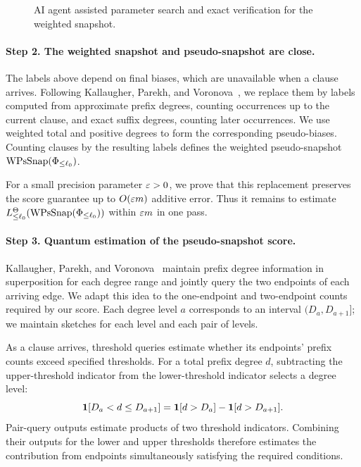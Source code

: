 \begin{figure}[htbp]
    \centering
    \makebox[\linewidth][l]{%
        \hspace*{-6.7mm}%
        \resizebox{\linewidth}{!}{%
        }%
    }
    \caption{AI agent assisted parameter search and exact verification for the weighted snapshot.}
    \label{fig:proof-overview}
\end{figure}

\begin{samepage}
\paragraph{Step 2. The weighted snapshot and pseudo-snapshot are close.}
The labels above depend on final biases, which are unavailable when a clause arrives. Following Kallaugher, Parekh, and Voronova~\cite{KPV23}, we replace them by labels computed from approximate prefix degrees, counting occurrences up to the current clause, and exact suffix degrees, counting later occurrences. We use weighted total and positive degrees to form the corresponding pseudo-biases. Counting clauses by the resulting labels defines the weighted pseudo-snapshot $\operatorname{WPsSnap}(\Phi_{\le\ell_0})$.

For a small precision parameter $\varepsilon>0$, we prove that this replacement preserves the score guarantee up to $O(\varepsilon m)$ additive error. Thus it remains to estimate $L_{\le\ell_0}^\Theta(\operatorname{WPsSnap}(\Phi_{\le\ell_0}))$ within $\varepsilon m$ in one pass.

\end{samepage}

\paragraph{Step 3. Quantum estimation of the pseudo-snapshot score.}
Kallaugher, Parekh, and Voronova~\cite{KPV23} maintain prefix degree information in superposition for each degree range and jointly query the two endpoints of each arriving edge. We adapt this idea to the one-endpoint and two-endpoint counts required by our score. Each degree level $a$ corresponds to an interval $(D_a,D_{a+1}]$; we maintain sketches for each level and each pair of levels.

As a clause arrives, threshold queries estimate whether its endpoints' prefix counts exceed specified thresholds. For a total prefix degree $d$, subtracting the upper-threshold indicator from the lower-threshold indicator selects a degree level:
\[
\mathbf 1[D_a<d\le D_{a+1}]=\mathbf 1[d>D_a]-\mathbf 1[d>D_{a+1}].
\]
Pair-query outputs estimate products of two threshold indicators. Combining their outputs for the lower and upper thresholds therefore estimates the contribution from endpoints simultaneously satisfying the required conditions.

